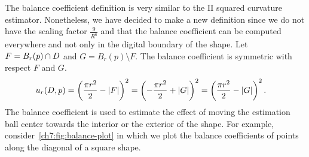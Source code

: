 The balance coefficient definition is very similar to the II squared curvature estimator. Nonetheless, we have decided to make a new definition since we do not have the scaling factor $\frac{9}{R^6}$ and that the balance coefficient can be computed everywhere and not only in the digital boundary of the shape. Let $F=B_r(p) \cap D$ and $G=B_r(p) \setminus F$. The balance coefficient is symmetric with respect $F$ and $G$. 
\begin{align*}
	u_r(D,p) &= \left( \frac{\pi r^2}{2} - |F| \right)^2 = \left( -\frac{\pi r^2}{2} + |G| \right)^2 = \left( \frac{\pi r^2}{2} - |G| \right)^2.
\end{align*}
%
The balance coefficient is used to estimate the effect of moving the estimation ball center towards the interior or the exterior of the shape. For example, consider~\cref{ch7:fig:balance-plot} in which we plot the balance coefficients of points along the diagonal of a square shape. 


